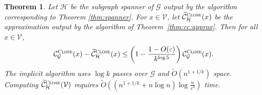 \documentclass{report}
\newtheorem{theorem}{Theorem}[section]
\newcommand{\algoname}[1]{\textnormal{\textsc{#1}}}
\begin{document}
%
\begin{theorem} \label{thm:cc:sstream:approx:light}
Let $\mathcal{H}$ be the subgraph spanner of $\mathcal{G}$ output by the algorithm corresponding to Theorem \ref{thm:spanner}.
For $x \in \mathcal{V}$, let $\widetilde{\mathcal{C}}^{\algoname{Close}}_{\mathcal{H}}(x)$ be the approximation output by the algorithm of Theorem~\ref{thm:cc:approx}. 
Then for all $x \in \mathcal{V}$,
%
\begin{equation} \label{eq:spanner:cc}
\mathcal{C}^{\algoname{Close}}_{\mathcal{G}}(x) - \widetilde{\mathcal{C}}^{\algoname{Close}}_{\mathcal{H}}(x) \leq \left ( 1 - \frac{1 - O(\varepsilon)}{k^{\log 5}} \right ) \mathcal{C}^{\algoname{Close}}_{\mathcal{G}}(x).
\end{equation}
%
The implicit algorithm uses $\log k$ passes over $\mathcal{G}$ and $\widetilde{O}(n^{1 + 1/k})$ space.
Computing $\widetilde{\mathcal{C}}^{\algoname{Close}}_{\mathcal{H}}(\mathcal{V})$ requires $\widetilde{O} \left ( \left (n^{1 + 1/k} + n \log n \right )\log \frac{n}{\varepsilon^3} \right )$ time.
\end{theorem}

 
\end{document}

